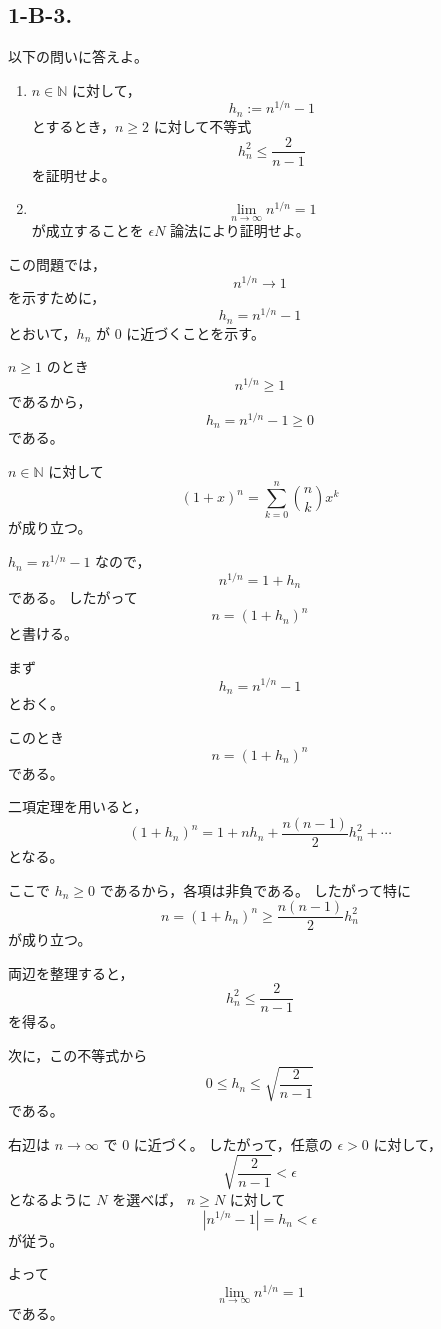 \subsection{1-B-3.}
\begin{exercise}
	以下の問いに答えよ。

	\begin{enumerate}
		\item $n\in\mathbb{N}$ に対して，
		\[
			h_n:=n^{1/n}-1
		\]
		とするとき，$n\geq 2$ に対して不等式
		\[
			h_n^2\leq \frac{2}{n-1}
		\]
		を証明せよ。

		\item
		\[
			\lim_{n\to\infty} n^{1/n}=1
		\]
		が成立することを $\epsilon N$ 論法により証明せよ。
	\end{enumerate}
\end{exercise}
\begin{background}
	この問題では，
	\[
		n^{1/n}\to 1
	\]
	を示すために，
	\[
		h_n=n^{1/n}-1
	\]
	とおいて，$h_n$ が $0$ に近づくことを示す。

	\begin{remark}
		$n\geq 1$ のとき
		\[
			n^{1/n}\geq 1
		\]
		であるから，
		\[
			h_n=n^{1/n}-1\geq 0
		\]
		である。
	\end{remark}

	\begin{theorem}[二項定理]
		$n\in\mathbb{N}$ に対して
		\[
			(1+x)^n
			=
			\sum_{k=0}^{n}\binom{n}{k}x^k
		\]
		が成り立つ。
	\end{theorem}

	\begin{remark}
		$h_n=n^{1/n}-1$ なので，
		\[
			n^{1/n}=1+h_n
		\]
		である。
		したがって
		\[
			n=(1+h_n)^n
		\]
		と書ける。
	\end{remark}
\end{background}
\begin{strategy}
	まず
	\[
		h_n=n^{1/n}-1
	\]
	とおく。

	このとき
	\[
		n=(1+h_n)^n
	\]
	である。

	二項定理を用いると，
	\[
		(1+h_n)^n
		=
		1+nh_n+\frac{n(n-1)}{2}h_n^2+\cdots
	\]
	となる。

	ここで $h_n\geq 0$ であるから，各項は非負である。
	したがって特に
	\[
		n=(1+h_n)^n
		\geq
		\frac{n(n-1)}{2}h_n^2
	\]
	が成り立つ。

	両辺を整理すると，
	\[
		h_n^2\leq \frac{2}{n-1}
	\]
	を得る。

	次に，この不等式から
	\[
		0\leq h_n\leq \sqrt{\frac{2}{n-1}}
	\]
	である。

	右辺は $n\to\infty$ で $0$ に近づく。
	したがって，任意の $\epsilon>0$ に対して，
	\[
		\sqrt{\frac{2}{n-1}}<\epsilon
	\]
	となるように $N$ を選べば，
	$n\geq N$ に対して
	\[
		|n^{1/n}-1|=h_n<\epsilon
	\]
	が従う。

	よって
	\[
		\lim_{n\to\infty}n^{1/n}=1
	\]
	である。
\end{strategy}